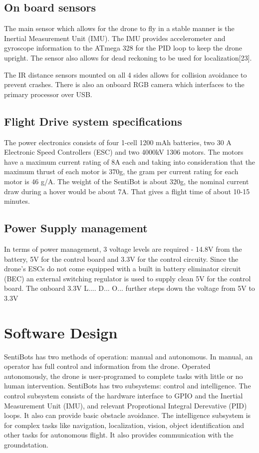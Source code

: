 \documentclass[12pt]{article}
\begin{document}
\subsection{On board sensors}

The main sensor which allows for the drone to fly in a stable manner is the Inertial Measurement Unit (IMU). The IMU provides accelerometer and gyroscope information to the ATmega 328 for the PID loop to keep the drone upright. The sensor also allows for dead reckoning to be used for localization[23].

The IR distance sensors mounted on all 4 sides allows for collision avoidance to prevent crashes. There is also an onboard RGB camera which interfaces to the primary processor over USB. 

\subsection{Flight Drive system specifications}

The power electronics consists of four 1-cell 1200 mAh batteries, two 30 A Electronic Speed Controllers (ESC) and two 4000kV 1306 motors. The motors have a maximum current rating of 8A each and taking into consideration that the maximum thrust of each motor is 370g, the gram per current rating for each motor is 46 g/A. The weight of the SentiBot is about 320g, the nominal current draw during a hover would be about 7A. That gives a flight time of about 10-15 minutes. 

\subsection{Power Supply management}

In terms of power management, 3 voltage levels are required - 14.8V from the battery, 5V for the control board and 3.3V for the control circuity. Since the drone’s ESCs do not come equipped with a built in battery eliminator circuit (BEC) an external switching regulator is used to supply clean 5V for the control board. The onboard 3.3V L.... D... O... further steps down the voltage from 5V to 3.3V

\section{Software Design}

SentiBots has two methods of operation: manual and autonomous. In manual, an operator has full control and information from the drone. Operated autonomously, the drone is user-programed to complete tasks with little or no human intervention. SentiBots has two subsystems: control and intelligence. The control subsystem consists of the hardware interface to GPIO and the Inertial Measurement Unit (IMU), and relevant Proprotional Integral Derevative (PID) loops. It also can provide basic obstacle avoidance. The intelligence subsystem is for complex tasks like navigation, localization, vision, object identification and other tasks for autonomous flight. It also provides communication with the groundstation.
\end{document}
